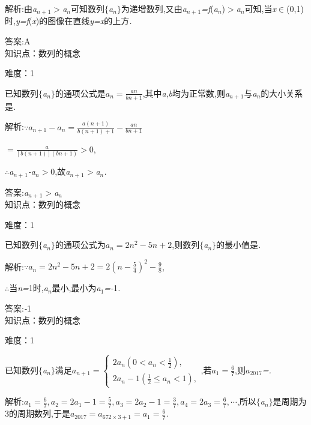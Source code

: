 \documentclass{article} %
\begin{document}
 解析:由\textit{a${}_{n+}$}${}_{1}$\textit{$>$a${}_{n}$}可知数列$\mathrm{\{}$\textit{a${}_{n}$}$\mathrm{\}}$为递增数列,又由\textit{a${}_{n+}$}${}_{1}$\textit{=f}(\textit{a${}_{n}$})\textit{$>$a${}_{n}$}可知,当\textit{x}$\mathrm{\in}$(0,1)时,\textit{y=f}(\textit{x})的图像在直线\textit{y=x}的上方\textit{.}

 答案:A \\

知识点：数列的概念

难度：1

 已知数列$\mathrm{\{}$\textit{a${}_{n}$}$\mathrm{\}}$的通项公式是$a_n=\frac{an}{bn+1}$,其中\textit{a},\textit{b}均为正常数,则\textit{a${}_{n+}$}${}_{1}$与\textit{a${}_{n}$}的大小关系是\textit{\underbar{　}.~}

 解析:$\because a_{n+1}-a_n = \frac{a(n+1)}{b(n+1)+1}-\frac{an}{bn+1}$

$=\frac{a}{[b(n+1)](bn+1)}>0$,

\textit{$\therefore$a${}_{n+}$}${}_{1}$\textit{-a${}_{n}$$>$}0,故\textit{a${}_{n+}$}${}_{1}$\textit{$>$a${}_{n}$.}

 答案:\textit{a${}_{n+}$}${}_{1}$\textit{$>$a${}_{n}$} \\

知识点：数列的概念

难度：1

 已知数列$\mathrm{\{}$\textit{a${}_{n}$}$\mathrm{\}}$的通项公式为$a_n=2n^2-5n+2$,则数列$\mathrm{\{}$\textit{a${}_{n}$}$\mathrm{\}}$的最小值是\textit{\underbar{　　　　　}.~}

 解析:$\because a_n = 2n^2-5n+2 = 2(n-\frac{5}{4})^2-\frac{9}{8}$,

\textit{$\therefore$}当\textit{n=}1时,\textit{a${}_{n}$}最小,最小为\textit{a}${}_{1}$\textit{=-}1\textit{.}

 答案:\textit{-}1 \\

知识点：数列的概念

难度：1

 已知数列$\mathrm{\{}$\textit{a${}_{n}$}$\mathrm{\}}$满足$a_{n+1}=\left\{
\begin{array}{l}
2a_n(0 <a_n <\frac{1}{2}), \\
2a_n-1(\frac{1}{2}\le a_n <1),
\end{array}\right.$,若$a_1=\frac{6}{7}$,则$a_{2017}$\textit{=\underbar{　}.~}

 解析:$a_1=\frac{6}{7},a_2 =2a_1-1= \frac{5}{7},a_3=2a_2-1=\frac{3}{7},a_4=2a_3=\frac{6}{7},\cdots$,所以$\mathrm{\{}$\textit{a${}_{n}$}$\mathrm{\}}$是周期为3的周期数列,于是$a_{2017}=a_{672\times 3+1}=a_1=\frac{6}{7}$\textit{.}
\end{document}

